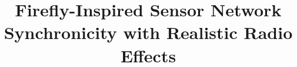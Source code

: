 \documentclass{article}
\begin{document}
\date{}


\title{{\ttlfnt Firefly-Inspired 
Sensor Network Synchronicity with Realistic Radio Effects}}



\maketitle

\thispagestyle{empty}




   



\end{document}
